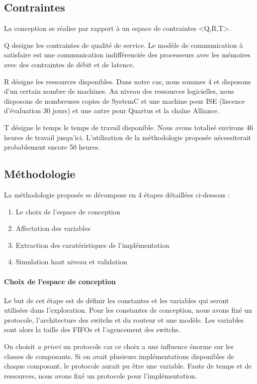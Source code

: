 \documentclass[11pt]{article}
\begin{document}
\subsection{Contraintes}

La conception se réalise par rapport à un espace de contraintes <Q,R,T>.

Q designe les contraintes de qualité de service. Le modèle de communication à satisfaire est une communication indifférenciée des processeurs avec les mémoires avec des contraintes de débit et de latence.

R désigne les ressources disponibles. Dans notre cas, nous sommes 4 et disposons d'un certain nombre de machines. Au niveau des ressources logicielles, nous disposons de nombreuses copies de SystemC et une machine pour ISE (liscence d'évaluation 30 jours) et une autre pour Quartus et la chaîne Alliance.

T désigne le temps le temps de travail disponible. Nous avons totalisé environs 46 heures de travail jusqu'ici. L'utilisation de la méthodologie proposée nécessiterait probablement encore 50 heures.

\subsection{Méthodologie}

La méthodologie proposée se décompose en 4 étapes détaillées ci-dessous :
\begin{enumerate}
\item Le choix de l'espace de conception
\item Affectation des variables
\item Extraction des caratéristiques de l'implémentation
\item Simulation haut niveau et validation
\end{enumerate}

\paragraph{Choix de l'espace de conception}
Le but de cet étape est de définir les constantes et les variables qui seront utilisées dans l'exploration. Pour les constantes de conception, nous avons fixé un protocole, l'architecture des switchs et du routeur et une modèle. Les variables sont alors la taille des FIFOs et l'agencement des switchs.
 
On choisit \textit{a priori} un protocole car ce choix a une influence énorme sur les classes de composants. Si on avait plusieurs implémentations disponibles de chaque composant, le protocole aurait pu être une variable. Faute de temps et de ressources, nous avons fixé un protocole pour l'implémentation.
\end{document}
